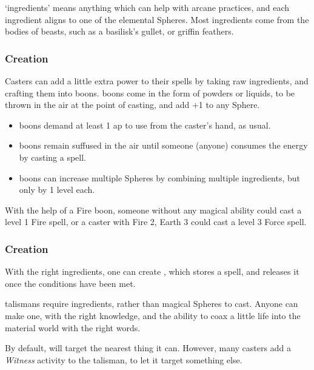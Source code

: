 \begin{multicols}{2}

\noindent
`\Glspl{ingredient}' means anything which can help with arcane practices, and each \gls{ingredient} aligns to one of the elemental Spheres.
Most \glspl{ingredient} come from the bodies of beasts, such as a basilisk's gullet, or griffin feathers.

\subsubsection{ Creation}

Casters can add a little extra power to their spells by taking raw \glspl{ingredient}, and crafting them into \glspl{boon}.
\Glspl{boon} come in the form of powders or liquids, to be thrown in the air at the point of casting, and add +1 to any Sphere.

\begin{itemize}
  \item
  \Glspl{boon} demand at least 1 \gls{ap} to use from the caster's hand, as usual.
  \item
  \Glspl{boon} remain suffused in the air until someone (anyone) consumes the energy by casting a spell.
  \item
  \Glspl{boon} can increase multiple Spheres by combining multiple \glspl{ingredient}, but only by 1 level each.
\end{itemize}

\noindent
With the help of a Fire \gls{boon}, someone without any magical ability could cast a level 1 Fire spell, or a caster with Fire 2, Earth 3 could cast a level 3 Force spell.

\subsubsection{ Creation}

With the right \glspl{ingredient}, one can create , which stores a spell, and releases it once the conditions have been met.

\Glspl{talisman} require \glspl{ingredient}, rather than magical Spheres to cast.
Anyone can make one, with the right knowledge, and the ability to coax a little life into the material world with the right words.

By default,  will target the nearest thing it can.
However, many casters add a \textit{Witness} activity to the \gls{talisman}, to let it target something else.


\end{multicols}
